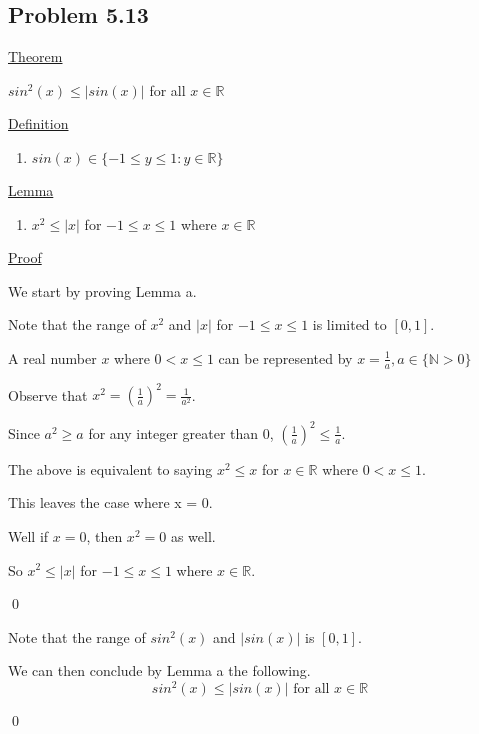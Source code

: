 \documentclass{article}
\begin{document}
\pagebreak


\subsection{Problem 5.13}
\underline{Theorem}
\begin{addmargin}[0.75cm]{0cm}
	$sin^2(x) \leq |sin(x)|$ for all $x \in \mathbb{R}$
\end{addmargin}

\underline{Definition}
\renewcommand{\labelenumi}{(\alph{enumi})}
\begin{enumerate}[leftmargin=1.35cm]
	\item $sin(x) \in \{-1 \leq y \leq 1 : y \in \mathbb{R}\}$
\end{enumerate}

\underline{Lemma}
\begin{enumerate}[leftmargin=1.35cm]
	\item $x^2 \leq |x|$ for $-1 \leq x \leq 1$ where $x \in \mathbb{R}$
\end{enumerate}

\underline{Proof}
\begin{addmargin}[0.75cm]{0cm}
	We start by proving Lemma a.
	
	Note that the range of $x^2$ and $|x|$ for $-1 \leq x \leq 1$ is limited to $[0,1]$.
	
	A real number $x$ where $0 < x \leq 1$ can be represented by $x = \frac{1}{a}, a \in \{\mathbb{N}>0\}$
	
	Observe that $x^2 = (\frac{1}{a})^2 = \frac{1}{a^2}$.
	
	Since $a^2 \geq a$ for any integer greater than 0, $(\frac{1}{a})^2 \leq \frac{1}{a}$.
	
	The above is equivalent to saying $x^2 \leq x$ for $x \in \mathbb{R}$ where $0 < x \leq 1$.
	
	This leaves the case where x = 0. 
	
	Well if $x = 0$, then $x^2 = 0$ as well.
	
	So $x^2 \leq |x|$ for $-1 \leq x \leq 1$ where $x \in \mathbb{R}$.
	
	\qed
	
	Note that the range of $sin^2(x)$ and $|sin(x)|$ is $[0,1]$.
	
	We can then conclude by Lemma a the following.
	\begin{equation}
		sin^2(x) \leq |sin(x)| \text{ for all } x \in \mathbb{R}
	\end{equation}	
	
	\qed
\end{addmargin}
\end{document}

